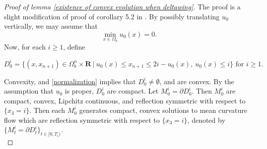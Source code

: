 \documentclass[pdflatex,sn-mathphys-num]{sn-jnl}%
\begin{document}
\begin{proof}[Proof of lemma \ref{existence of convex evolution when deltawing}]
The proof is a slight modification of proof of corollary 5.2 in \cite{Daskalopoulos2021UniquenessOE}. By possibly translating $u_0$ vertically, we may assume that 
\begin{equation}\label{normalization}
\min_{x \in \Omega_b}u_0(x) = 0.    
\end{equation}
Now, for each $i \geq 1$, define

\begin{equation}\label{def of auxilary appx domain}
    D^i_0 = \{(x, x_{n+1}) \in \Omega^n_b\times \mathbf{R}\ | \ u_0(x) \leq x_{n+1} \leq 2i - u_0(x), \ u_0(x) \leq i\} \text{ for }i \geq 1.
\end{equation}

Convexity, and \eqref{normalization} implies that $D^i_0 \neq \emptyset$, and are convex. By the assumption that $u_0$ is proper, $D^i_0$ are compact. Let $M^i_0 = \partial D^i_0$. Then $M^i_0$ are compact, convex, Lipchitz continuous, and reflection symmetric with respect to $\{x_3 = i\}$. Then each $M^i_0$ generates compact, convex solutions to mean curvature flow which are reflection symmetric with respect to $\{x_3 = i\}$, denoted by $\{M^i_t = \partial D^i_t\}_{t \in [0, T_i)}$. \\


\end{proof}
\end{document}
